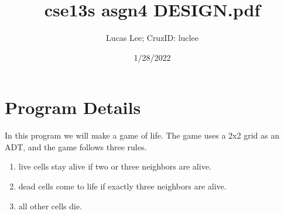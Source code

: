 \documentclass[11pt]{article}
\title{cse13s asgn4 DESIGN.pdf}
\author{Lucas Lee; CruzID: luclee}
\date{1/28/2022}
\begin{document}
\maketitle

\section{Program Details}\label{ss:details}
In this program we will make a game of life. The game uses a 2x2 grid as an ADT, and the game follows three rules.
\begin{enumerate}
	\item live cells stay alive if two or three neighbors are alive.
	\item dead cells come to life if exactly three neighbors are alive.
	\item all other cells die.
\end{enumerate}
\end{document}
